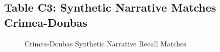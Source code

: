 \documentclass{article}
\begin{document}
\hypertarget{table-c3-synthetic-narrative-matches-crimea-donbas}{%
\subsection{Table C3: Synthetic Narrative Matches
Crimea-Donbas}\label{table-c3-synthetic-narrative-matches-crimea-donbas}}

\hphantom{em}

\begin{figure}[H]
\caption{ Crimea-Donbas Synthetic Narrative Recall Matches \label{fig:ft_crimea_recall}}
\end{figure}
\clearpage
\end{document}
